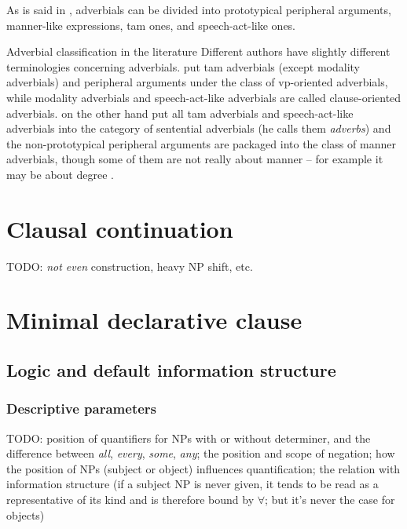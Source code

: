 \documentclass[UTF8, a4paper, oneside, scheme=plain]{ctexrep}
\newcommand*{\citepage}[1]{pp.~{#1}}
\newcommand*{\term}[1]{\emph{#1}}
\newcommand{\corpus}[1]{\emph{#1}}
\begin{document}
As is said in ,
adverbials can be divided into 
prototypical peripheral arguments,
manner-like expressions, 
\acs{tam} ones, and speech-act-like ones.

\begin{infobox}{Adverbial classification in the literature}
    Different authors have slightly different terminologies concerning adverbials.
    \citet[\citepage{576}]{cgel} put \acs{tam} adverbials (except modality adverbials) 
    and peripheral arguments
    under the class of \acs{vp}-oriented adverbials, 
    while modality adverbials and speech-act-like adverbials are called clause-oriented adverbials.
    \citet[\citepage{386}]{dixon2005semantic} on the other hand 
    put all \acs{tam} adverbials and speech-act-like adverbials 
    into the category of sentential adverbials (he calls them \term{adverbs})
    and the non-prototypical peripheral arguments are packaged into the class of manner adverbials,
    though some of them are not really about manner -- 
    for example it may be about degree \citet[\citepage{576}]{cgel}.
\end{infobox}

\section{Clausal continuation}

TODO: \corpus{not even} construction, heavy NP shift, etc.

\section{Minimal declarative clause}

\subsection{Logic and default information structure}

\subsubsection{Descriptive parameters}

TODO: position of quantifiers for NPs with or without determiner,
and the difference between \corpus{all}, \corpus{every}, \corpus{some}, \corpus{any};
the position and scope of negation;
how the position of NPs (subject or object) influences quantification;
the relation with information structure
(if a subject NP is never given, 
it tends to be read as a representative of its kind and is therefore bound by $\forall$;
but it's never the case for objects)
\end{document}

